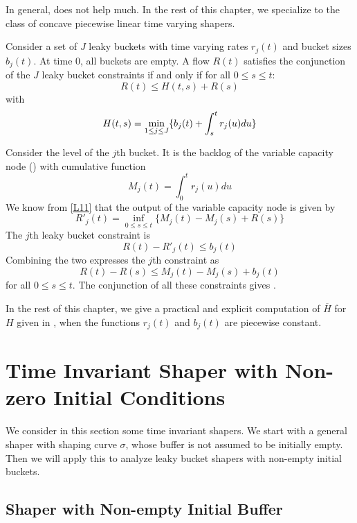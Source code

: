In general,  does not help much. In the rest of
this chapter, we specialize to the class of concave piecewise
linear time varying shapers.
\begin{proposition}
Consider a set of $J$ leaky buckets with time varying rates
$r_j(t)$ and  bucket sizes $b_j(t)$. At time $0$, all buckets are
empty. A flow $R(t)$ satisfies the conjunction of the $J$ leaky
bucket constraints if and only if for all $0\leq s \leq t$:
$$R(t) \leq H(t,s) + R(s)$$
with
\begin{equation}\mylabel{eq-1sdoasj}
  H(t,s)= \min_{1 \leq j \leq J} \{ b_{j}(t)+ \int_{s}^t r_{j}(u) du \}
\end{equation}
\end{proposition}
\pr
Consider the level of the $j$th bucket. It is the backlog of the
variable capacity node () with cumulative function
$$M_j(t) = \int_{0}^t r_{j}(u) du $$
We know from \cref{L11} that the output of the variable capacity
node is given by
 $$
 R'_j(t)=\inf_{0 \leq s \leq t} \{ M_j(t) -M_j(s) + R(s) \}
 $$
The $j$th leaky bucket constraint is
 $$R(t)-R'_j(t) \leq b_j(t)$$
Combining the two expresses the $j$th constraint as
$$
R(t)-R(s) \leq M_j(t) -M_j(s) + b_j(t)
$$
for all $0\leq s \leq t$. The conjunction of all these constraints
gives .

In the rest of this chapter, we give a practical and explicit
computation of $\overline{H} $ for $H$ given in ,
when the functions $r_j(t)$ and $b_j(t)$ are piecewise constant.

\section[Time Invariant Shaper with Initial Conditions]{Time Invariant Shaper with Non-zero Initial Conditions}
We consider in this section some time invariant shapers. We start
with a general shaper with shaping curve $\sigma$, whose buffer is
not assumed to be initially empty. Then we will apply this to
analyze leaky bucket shapers with non-empty initial buckets.

\subsection{Shaper with Non-empty Initial Buffer}

